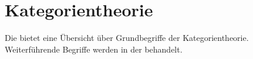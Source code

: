 \documentclass{cheat-sheet}
\begin{document}

\section{Kategorientheorie}

\begin{bem}
  Die  bietet eine Übersicht über Grundbegriffe der Kategorientheorie. Weiterführende Begriffe werden in der  behandelt.
\end{bem}

\end{document}
